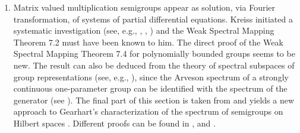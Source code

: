 \begin{enumerate}[label=\emph{Section \arabic*:}, wide]
\item 
Matrix valued multiplication semigroups appear as solution, via Fourier transformation, of systems of partial differential equations.
Kreiss initiated a systematic investigation (see, e.g., \citet{kreiss:1958}, \citet{kreiss:1959}, \citet{millerstrang:1966}) and the Weak Spectral Mapping Theorem 7.2 must have been known to him. The direct proof of the Weak Spectral Mapping Theorem 7.4 for polynomially bounded groups seems to be new. The result can also be deduced from the theory of spectral subspaces of group representations (see, e.g., \citet{combesdelaroche:1978}), since the Arveson spectrum of a strongly continuous one-parameter group can be identified with the spectrum of the generator (see \citet{evans:1976}). The final part of this section is taken from \citet{greiner:1985} and yields a new approach to Gearhart's characterization of the spectrum of semigroups on Hilbert spaces \citet{gearhart:1978}. Different proofs can be found in \citet{herbst:1983}, \citet{howland:1984} and \citet{pruess:1984}. 
\end{enumerate}




